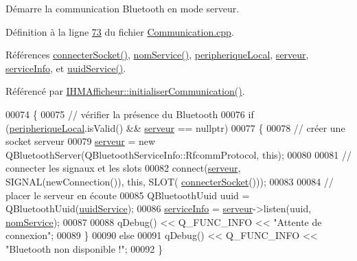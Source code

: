 Démarre la communication Bluetooth en mode serveur. 

Définition à la ligne \hyperlink{_communication_8cpp_source_l00073}{73} du fichier \hyperlink{_communication_8cpp_source}{Communication.\+cpp}.



Références \hyperlink{_communication_8cpp_source_l00116}{connecter\+Socket()}, \hyperlink{_communication_8h_afd6061bebcd621de34bc921326538181}{nom\+Service()}, \hyperlink{_communication_8h_source_l00053}{peripherique\+Local}, \hyperlink{_communication_8h_source_l00051}{serveur}, \hyperlink{_communication_8h_source_l00054}{service\+Info}, et \hyperlink{_communication_8h_a6f285f3a7cee5c6573729d7e6b99dbf4}{uuid\+Service()}.



Référencé par \hyperlink{_i_h_m_afficheur_8cpp_source_l00074}{I\+H\+M\+Afficheur\+::initialiser\+Communication()}.


\begin{DoxyCode}
00074 \{
00075     \textcolor{comment}{// vérifier la présence du Bluetooth}
00076     \textcolor{keywordflow}{if} (\hyperlink{class_communication_a2d643d199169dfe1d258df54d3ee5728}{peripheriqueLocal}.isValid() && \hyperlink{class_communication_a6384747297d6efa9e8fd2fc79ed0c269}{serveur} == \textcolor{keyword}{nullptr})
00077     \{
00078         \textcolor{comment}{// créer une socket serveur}
00079         \hyperlink{class_communication_a6384747297d6efa9e8fd2fc79ed0c269}{serveur} = \textcolor{keyword}{new} QBluetoothServer(QBluetoothServiceInfo::RfcommProtocol, \textcolor{keyword}{this});
00080 
00081         \textcolor{comment}{// connecter les signaux et les slots}
00082         connect(\hyperlink{class_communication_a6384747297d6efa9e8fd2fc79ed0c269}{serveur}, SIGNAL(newConnection()), \textcolor{keyword}{this}, SLOT(
      \hyperlink{class_communication_a1ef7e4107d98346290f19f76d7eecf32}{connecterSocket}()));
00083 
00084         \textcolor{comment}{// placer le serveur en écoute}
00085         QBluetoothUuid uuid = QBluetoothUuid(\hyperlink{_communication_8h_a6f285f3a7cee5c6573729d7e6b99dbf4}{uuidService});
00086         \hyperlink{class_communication_aa7f9ee5e5d90336a56857ebc229e4274}{serviceInfo} = \hyperlink{class_communication_a6384747297d6efa9e8fd2fc79ed0c269}{serveur}->listen(uuid, \hyperlink{_communication_8h_afd6061bebcd621de34bc921326538181}{nomService});
00087 
00088         qDebug() << Q\_FUNC\_INFO << \textcolor{stringliteral}{"Attente de connexion"};
00089     \}
00090     \textcolor{keywordflow}{else}
00091         qDebug() << Q\_FUNC\_INFO << \textcolor{stringliteral}{"Bluetooth non disponible !"};
00092 \}
\end{DoxyCode}
\mbox{\label{class_communication_a4c828450e0ff92818c878ee28f240662}} 
